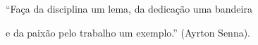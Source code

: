 
\begin{epigrafe}
\vspace*{\fill}
\begin{flushleft}
\justify
\hspace{4cm} ``Faça da disciplina um lema, da dedicação uma bandeira

\hspace{3,4cm} e da paixão pelo trabalho um exemplo.'' (Ayrton Senna).
\end{flushleft}

\end{epigrafe}

